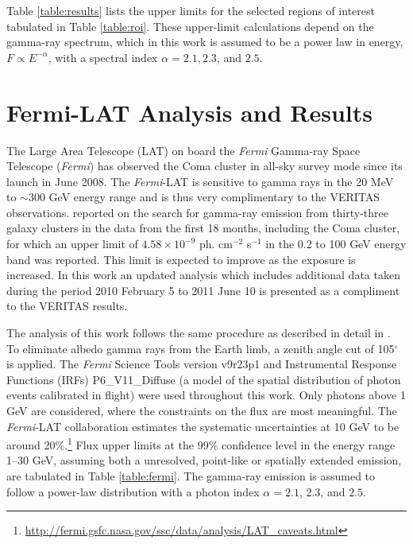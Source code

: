\documentclass[12pt,manuscript]{aastex}
\begin{document}
Table \ref{table:results} lists the upper limits for the selected regions of interest tabulated in
Table \ref{table:roi}. These upper-limit calculations depend on the gamma-ray spectrum, which in
this work is assumed to be a power law in energy, $F\propto E^{-\alpha}$, with a spectral index
$\alpha=2.1, 2.3$, and $2.5$.

%
%

\section{Fermi-LAT Analysis and Results}
The Large Area Telescope (LAT) on board the \emph{Fermi} Gamma-ray Space Telescope (\emph{Fermi})
has observed the Coma cluster in all-sky survey mode since its launch in June 2008. The
\emph{Fermi}-LAT is sensitive to gamma rays in the 20 MeV to $\sim$300 GeV energy range and is thus
very complimentary to the VERITAS observations. \citet{article:Ackermann_etal:2010} reported on the
search for gamma-ray emission from thirty-three galaxy clusters in the data from the first 18
months, including the Coma cluster, for which an upper limit of $4.58\times 10^{-9}$ ph. cm$^{-2}$
s$^{-1}$ in the 0.2 to 100 GeV energy band was reported. This limit is expected to improve as the
exposure is increased. In this work an updated analysis which includes additional data taken during
the period 2010 February 5 to 2011 June 10 is presented as a compliment to the VERITAS results.

The analysis of this work follows the same procedure as described in detail in
\citet{article:Abdo_etal:2009}. To eliminate albedo gamma rays from the Earth limb, a zenith angle
cut of 105$^{\circ}$ is applied. The \emph{Fermi} Science Tools version v9r23p1 and Instrumental
Response Functions (IRFs) P6\_V11\_Diffuse (a model of the spatial distribution of photon events
calibrated in flight) were used throughout this work. Only photons above 1 GeV are considered, where
the constraints on the flux are most meaningful. The \emph{Fermi}-LAT collaboration estimates the
systematic uncertainties at 10 GeV to be around
20\%.\footnote{\url{http://fermi.gsfc.nasa.gov/ssc/data/analysis/LAT\_caveats.html}} Flux upper
limits at the 99\% confidence level in the energy range 1--30 GeV, assuming both a unresolved,
point-like or spatially extended emission, are tabulated in Table \ref{table:fermi}. The gamma-ray
emission is assumed to follow a power-law distribution with a photon index $\alpha=2.1$, 2.3, and
$2.5$.

%
%
\end{document}
